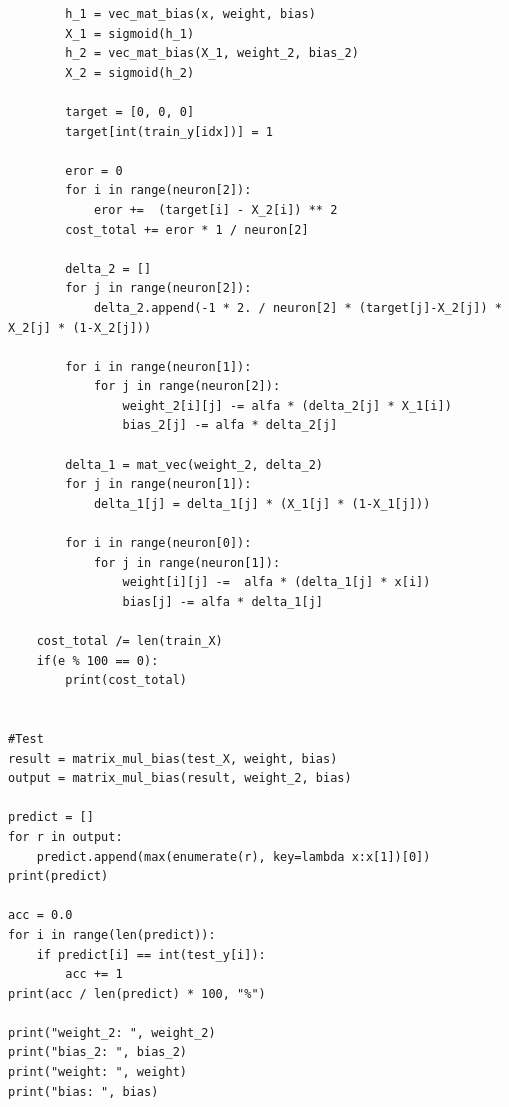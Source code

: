 \documentclass[11pt]{article}
\begin{document}
\begin{lstlisting}
        h_1 = vec_mat_bias(x, weight, bias)
        X_1 = sigmoid(h_1)
        h_2 = vec_mat_bias(X_1, weight_2, bias_2)
        X_2 = sigmoid(h_2)
    
        target = [0, 0, 0]
        target[int(train_y[idx])] = 1

        eror = 0
        for i in range(neuron[2]):
            eror +=  (target[i] - X_2[i]) ** 2 
        cost_total += eror * 1 / neuron[2]

        delta_2 = []
        for j in range(neuron[2]):
            delta_2.append(-1 * 2. / neuron[2] * (target[j]-X_2[j]) * X_2[j] * (1-X_2[j]))

        for i in range(neuron[1]):
            for j in range(neuron[2]):
                weight_2[i][j] -= alfa * (delta_2[j] * X_1[i])
                bias_2[j] -= alfa * delta_2[j]
        
        delta_1 = mat_vec(weight_2, delta_2)
        for j in range(neuron[1]):
            delta_1[j] = delta_1[j] * (X_1[j] * (1-X_1[j]))
        
        for i in range(neuron[0]):
            for j in range(neuron[1]):
                weight[i][j] -=  alfa * (delta_1[j] * x[i])
                bias[j] -= alfa * delta_1[j]

    cost_total /= len(train_X)
    if(e % 100 == 0):
        print(cost_total)


#Test
result = matrix_mul_bias(test_X, weight, bias)
output = matrix_mul_bias(result, weight_2, bias)

predict = []
for r in output:
    predict.append(max(enumerate(r), key=lambda x:x[1])[0])
print(predict)

acc = 0.0
for i in range(len(predict)):
    if predict[i] == int(test_y[i]):
        acc += 1
print(acc / len(predict) * 100, "%")

print("weight_2: ", weight_2)
print("bias_2: ", bias_2)
print("weight: ", weight)
print("bias: ", bias)
\end{lstlisting}
\end{document}
